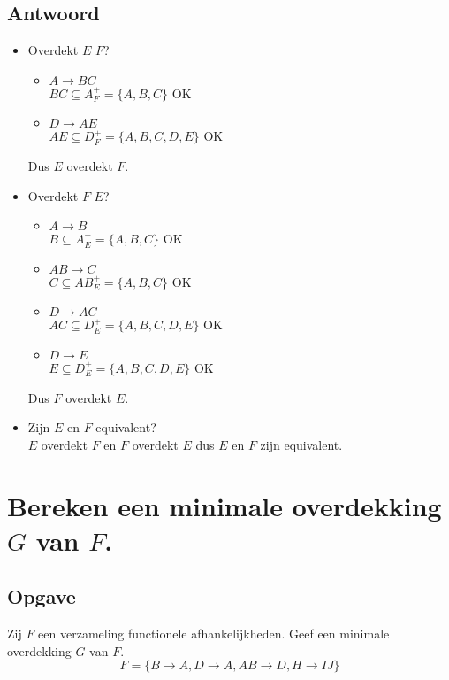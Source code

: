 \documentclass[normaalvormen.tex]{subfiles}
\begin{document}
\subsection*{Antwoord}
\begin{itemize}
\item Overdekt $E$ $F$?
\begin{itemize}
\item $A \rightarrow BC$\\
$BC \subseteq A_{F}^{+} = \{A,B,C\}$ OK
\item $D\rightarrow AE$\\
$AE \subseteq D_{F}^{+} = \{A,B,C,D,E\}$ OK
\end{itemize}
Dus $E$ overdekt $F$.
\item Overdekt $F$ $E$?\\
\begin{itemize}
\item $A\rightarrow B$\\
$B \subseteq A_{E}^{+} = \{A,B,C\}$ OK
\item $AB\rightarrow C$\\
$C \subseteq AB_{E}^{+} = \{A,B,C\}$ OK
\item $D\rightarrow AC$\\
$AC \subseteq D_{E}^{+} = \{A,B,C,D,E\}$ OK
\item $D\rightarrow E$\\
$E \subseteq D_{E}^{+} = \{A,B,C,D,E\}$ OK
\end{itemize}
Dus $F$ overdekt $E$.
\item Zijn $E$ en $F$ equivalent?\\
$E$ overdekt $F$ en $F$ overdekt $E$ dus $E$ en $F$ zijn equivalent.
\end{itemize}

\section{Bereken een minimale overdekking $G$ van $F$.}
\subsection*{Opgave}
Zij $F$ een verzameling functionele afhankelijkheden. Geef een minimale overdekking $G$ van $F$.
\[
F = \{ B\rightarrow A, D\rightarrow A, AB \rightarrow D, H\rightarrow IJ\}
\]
\end{document}
